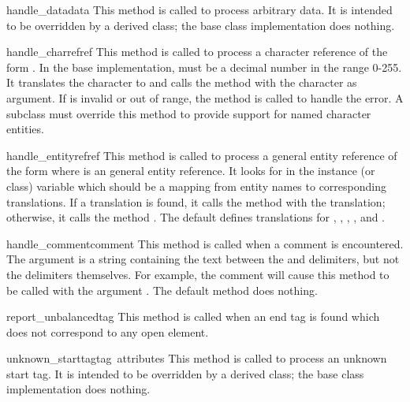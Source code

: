 \begin{funcdesc}{handle_data}{data}
This method is called to process arbitrary data.  It is intended to be
overridden by a derived class; the base class implementation does
nothing.
\end{funcdesc}

\begin{funcdesc}{handle_charref}{ref}
This method is called to process a character reference of the form
.  In the base implementation,  must
be a decimal number in the
range 0-255.  It translates the character to \ASCII{} and calls the
method  with the character as argument.  If
 is invalid or out of range, the method
 is called to handle the error.  A
subclass must override this method to provide support for named
character entities.
\end{funcdesc}

\begin{funcdesc}{handle_entityref}{ref}
This method is called to process a general entity reference of the
form  where  is an general entity
reference.  It looks for  in the instance (or class)
variable  which should be a mapping from entity
names to corresponding translations.
If a translation is found, it calls the method 
with the translation; otherwise, it calls the method
.  The default 
defines translations for , , ,
, and .
\end{funcdesc}

\begin{funcdesc}{handle_comment}{comment}
This method is called when a comment is encountered.  The
 argument is a string containing the text between the
\samp{<!--} and \samp{-->} delimiters, but not the delimiters
themselves.  For example, the comment  will
cause this method to be called with the argument .  The
default method does nothing.
\end{funcdesc}

\begin{funcdesc}{report_unbalanced}{tag}
This method is called when an end tag is found which does not
correspond to any open element.
\end{funcdesc}

\begin{funcdesc}{unknown_starttag}{tag\, attributes}
This method is called to process an unknown start tag.  It is intended
to be overridden by a derived class; the base class implementation
does nothing.
\end{funcdesc}

